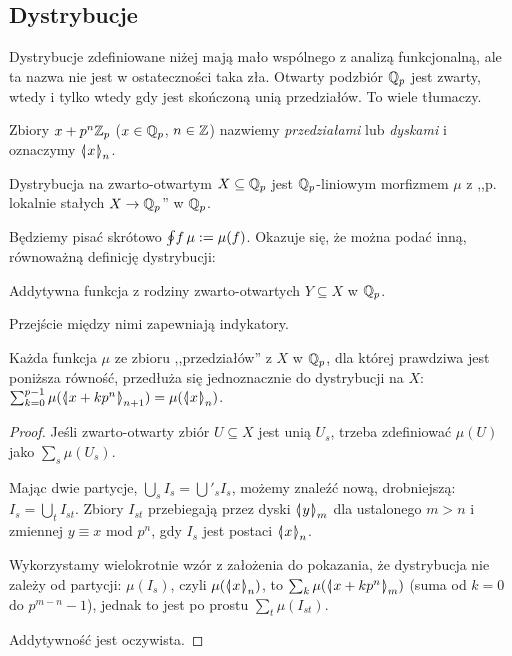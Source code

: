 \subsection{Dystrybucje} 
Dystrybucje zdefiniowane niżej mają mało wspólnego z analizą funkcjonalną, ale ta nazwa nie jest w ostateczności taka zła.
Otwarty podzbiór $\mathbb Q_p$ jest zwarty, wtedy i tylko wtedy gdy jest skończoną unią przedziałów. 
To wiele tłumaczy.

Zbiory $x+p^n \mathbb Z_p$ ($x \in \mathbb Q_p$, $n \in \mathbb Z$) nazwiemy \emph{przedziałami} lub \emph{dyskami} i oznaczymy $\mathrel{\langle\mkern-3.85mu\mid\mkern-4mu} {x}\mathrel{\mkern-4mu\mid\mkern-3.85mu\rangle}_{n}$.

\begin{definicja}
	Dystrybucja na zwarto-otwartym $X \subseteq \mathbb Q_p$ jest $\mathbb Q_p$-liniowym morfizmem $\mu$ z ,,p. lokalnie stałych $X \to \mathbb Q_p$'' w $\mathbb Q_p$.
\end{definicja}

Będziemy pisać skrótowo $\oint \!f\, \mu := \mu(f)$.
Okazuje się, że można podać inną, równoważną definicję dystrybucji:

\begin{definicja}
	Addytywna funkcja z rodziny zwarto-otwartych $Y \subseteq X$ w $\mathbb Q_p$.
\end{definicja}

Przejście między nimi zapewniają indykatory.

\begin{fakt} \label{sonrisa}
	Każda funkcja $\mu$ ze zbioru ,,przedziałów'' z $X$ w $\mathbb Q_p$, dla której prawdziwa jest poniższa równość, przedłuża się jednoznacznie do dystrybucji na $X$: $\sum_{k = 0}^{p-1} \mu (\mathrel{\langle\mkern-3.85mu\mid\mkern-4mu} {x + kp^n}\mathrel{\mkern-4mu\mid\mkern-3.85mu\rangle}_{n+1}) = \mu(\mathrel{\langle\mkern-3.85mu\mid\mkern-4mu} {x}\mathrel{\mkern-4mu\mid\mkern-3.85mu\rangle}_{n})$.
\end{fakt}

\begin{proof}
	Jeśli zwarto-otwarty zbiór $U \subseteq X$ jest unią $U_s$, trzeba zdefiniować $\mu(U)$ jako $\sum_s \mu(U_s)$.

	Mając dwie partycje, $\bigcup_s I_s = \bigcup'_s I_s$, możemy znaleźć nową, drobniejszą: $I_s = \bigcup_t I_{st}$.
	Zbiory $I_{st}$ przebiegają przez dyski $\mathrel{\langle\mkern-3.85mu\mid\mkern-4mu} {y}\mathrel{\mkern-4mu\mid\mkern-3.85mu\rangle}_{m}$ dla ustalonego $m > n$ i zmiennej $y \equiv x$ mod $p^n$, gdy $I_s$ jest postaci $\mathrel{\langle\mkern-3.85mu\mid\mkern-4mu} {x}\mathrel{\mkern-4mu\mid\mkern-3.85mu\rangle}_{n}$.

	Wykorzystamy wielokrotnie wzór z założenia do pokazania, że dystrybucja nie zależy od partycji: $\mu(I_s)$, czyli $\mu(\mathrel{\langle\mkern-3.85mu\mid\mkern-4mu} {x}\mathrel{\mkern-4mu\mid\mkern-3.85mu\rangle}_{n})$, to $\sum_k \mu(\mathrel{\langle\mkern-3.85mu\mid\mkern-4mu} {x + kp^n}\mathrel{\mkern-4mu\mid\mkern-3.85mu\rangle}_{m})$ (suma od $k = 0$ do $p^{m-n}-1$), jednak to jest po prostu $\sum_t \mu(I_{st})$.

	Addytywność jest oczywista.
\end{proof}

